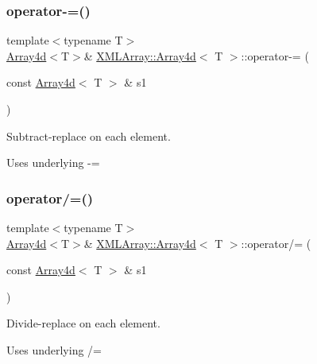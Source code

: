 \subsubsection{\texorpdfstring{operator-\/=()}{operator-=()}\hspace{0.1cm}{\footnotesize\ttfamily [2/2]}}
{\footnotesize\ttfamily template$<$typename T$>$ \\
\mbox{\hyperlink{classXMLArray_1_1Array4d}{Array4d}}$<$T$>$\& \mbox{\hyperlink{classXMLArray_1_1Array4d}{X\+M\+L\+Array\+::\+Array4d}}$<$ T $>$\+::operator-\/= (\begin{DoxyParamCaption}\item[{const \mbox{\hyperlink{classXMLArray_1_1Array4d}{Array4d}}$<$ T $>$ \&}]{s1 }\end{DoxyParamCaption})\hspace{0.3cm}{\ttfamily [inline]}}



Subtract-\/replace on each element. 

Uses underlying -\/= \mbox{\label{classXMLArray_1_1Array4d_ac8d0ba2bc4f085bf48baf6530db0cfcb}} 
\subsubsection{\texorpdfstring{operator/=()}{operator/=()}\hspace{0.1cm}{\footnotesize\ttfamily [1/4]}}
{\footnotesize\ttfamily template$<$typename T$>$ \\
\mbox{\hyperlink{classXMLArray_1_1Array4d}{Array4d}}$<$T$>$\& \mbox{\hyperlink{classXMLArray_1_1Array4d}{X\+M\+L\+Array\+::\+Array4d}}$<$ T $>$\+::operator/= (\begin{DoxyParamCaption}\item[{const \mbox{\hyperlink{classXMLArray_1_1Array4d}{Array4d}}$<$ T $>$ \&}]{s1 }\end{DoxyParamCaption})\hspace{0.3cm}{\ttfamily [inline]}}



Divide-\/replace on each element. 

Uses underlying /= \mbox{\label{classXMLArray_1_1Array4d_ac8d0ba2bc4f085bf48baf6530db0cfcb}} 
